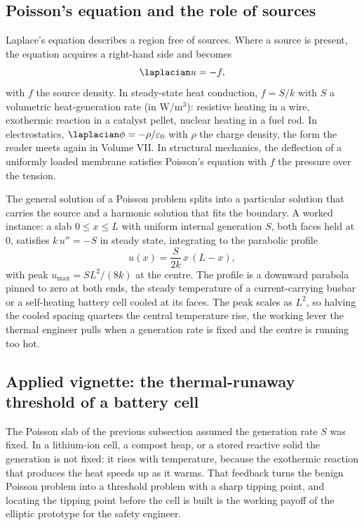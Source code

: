 \subsection{Poisson's equation and the role of sources}

Laplace's equation describes a region free of sources. Where a
source is present, the equation acquires a right-hand side and
becomes 
\[
\laplacian u = -f,
\]
with $f$ the source density. In steady-state heat conduction,
$f = S/k$ with $S$ a volumetric heat-generation rate (in $\si{\watt
\per\meter\cubed}$): resistive heating in a wire, exothermic
reaction in a catalyst pellet, nuclear heating in a fuel rod. In
electrostatics, $\laplacian \phi = -\rho/\varepsilon_{0}$ with
$\rho$ the charge density, the form the reader meets again in
Volume VII. In structural mechanics, the deflection of a uniformly
loaded membrane satisfies Poisson's equation with $f$ the pressure
over the tension.

The general solution of a Poisson problem splits into a particular
solution that carries the source and a harmonic solution that fits
the boundary. A worked instance: a slab $0 \leq x \leq L$ with
uniform internal generation $S$, both faces held at $0$, satisfies
$k\, u'' = -S$ in steady state, integrating to the parabolic profile
\[
u(x) = \frac{S}{2k}\, x\,(L - x),
\]
with peak $u_{\max} = S L^{2}/(8k)$ at the centre. The profile is a
downward parabola pinned to zero at both ends, the steady
temperature of a current-carrying busbar or a self-heating
battery cell cooled at its faces. The peak scales as $L^{2}$, so
halving the cooled spacing quarters the central temperature rise,
the working lever the thermal engineer pulls when a generation rate
is fixed and the centre is running too hot.

\subsection{Applied vignette: the thermal-runaway threshold of a battery cell}

The Poisson slab of the previous subsection assumed the generation
rate $S$ was fixed. In a lithium-ion cell, a compost heap, or a
stored reactive solid the generation is not fixed: it rises with
temperature, because the exothermic reaction that produces the heat
speeds up as it warms. That feedback turns the benign Poisson problem
into a threshold problem with a sharp tipping point, and locating the
tipping point before the cell is built is the working payoff of the
elliptic prototype for the safety engineer.

